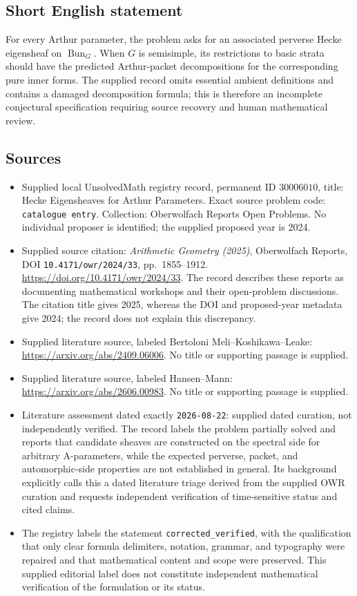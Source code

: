 \documentclass[11pt]{article}
\begin{document}
\subsection{Short English statement}
For every Arthur parameter, the problem asks for an associated perverse Hecke eigensheaf on \(\operatorname{Bun}_G\). When \(G\) is semisimple, its restrictions to basic strata should have the predicted Arthur-packet decompositions for the corresponding pure inner forms. The supplied record omits essential ambient definitions and contains a damaged decomposition formula; this is therefore an incomplete conjectural specification requiring source recovery and human mathematical review.
\subsection{Sources}
\begin{itemize}
\item Supplied local UnsolvedMath registry record, permanent ID \(30006010\), title: Hecke Eigensheaves for Arthur Parameters. Exact source problem code: \texttt{catalogue entry}. Collection: Oberwolfach Reports Open Problems. No individual proposer is identified; the supplied proposed year is 2024.
\item Supplied source citation: \emph{Arithmetic Geometry (2025)}, Oberwolfach Reports, DOI \texttt{10.4171/owr/2024/33}, pp.\ 1855--1912. \url{https://doi.org/10.4171/owr/2024/33}. The record describes these reports as documenting mathematical workshops and their open-problem discussions. The citation title gives 2025, whereas the DOI and proposed-year metadata give 2024; the record does not explain this discrepancy.
\item Supplied literature source, labeled Bertoloni Meli--Koshikawa--Leake: \url{https://arxiv.org/abs/2409.06006}. No title or supporting passage is supplied.
\item Supplied literature source, labeled Hansen--Mann: \url{https://arxiv.org/abs/2606.00983}. No title or supporting passage is supplied.
\item Literature assessment dated exactly \texttt{2026-08-22}: supplied dated curation, not independently verified. The record labels the problem partially solved and reports that candidate sheaves are constructed on the spectral side for arbitrary A-parameters, while the expected perverse, packet, and automorphic-side properties are not established in general. Its background explicitly calls this a dated literature triage derived from the supplied OWR curation and requests independent verification of time-sensitive status and cited claims.
\item The registry labels the statement \texttt{corrected\_verified}, with the qualification that only clear formula delimiters, notation, grammar, and typography were repaired and that mathematical content and scope were preserved. This supplied editorial label does not constitute independent mathematical verification of the formulation or its status.
\end{itemize}
\end{document}
